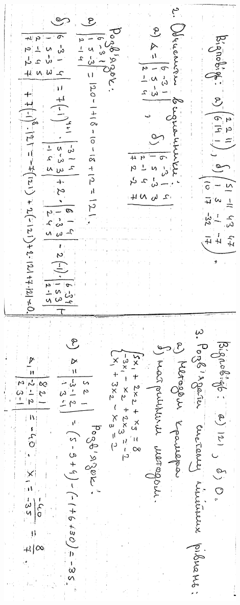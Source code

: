 \documentclass{article}
\begin{document}
\includegraphics[width=12cm,angle=90]{ons/2.jpg}\\
\includegraphics[width=12cm,angle=90]{ons/3.jpg}\\
\end{document}
